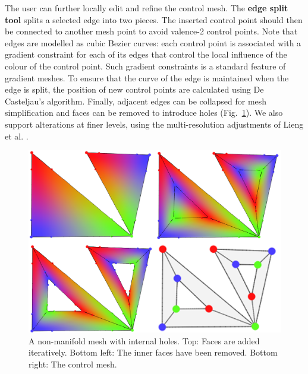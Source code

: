 \documentclass{egpubl}
\newcommand{\note}[3]{{\color{#2}\textbf{#1: #3}}}
\newcommand{\unsure}[1]{\note{USIKKER}{Green}{#1}}
\begin{document}
	The user can further locally edit and refine the control mesh. The \textbf{edge split tool} splits a selected edge into two pieces. The inserted control point should then be connected to another mesh point to avoid valence-2 control points. Note that edges are modelled as cubic Bezier curves: each control point is associated with a gradient constraint for each of its edges that control the local influence of the colour of the control point. Such gradient constraints is a standard feature of gradient meshes. To ensure that the curve of the edge is maintained when the edge is split, the position of new control points are calculated using De Casteljau's algorithm. Finally, adjacent edges can be collapsed for mesh simplification and faces can be removed to introduce holes (Fig.~\ref{fig:nonManifoldHoleMesh}). We also support alterations at finer levels, using the multi-resolution adjustments of Lieng et al. \cite{Lieng:2016}.
	
	
	\begin{figure}[t]
		\centering
		\includegraphics[scale=0.2]{HoleAndNonManifoldMesh.png}
		\caption{A non-manifold mesh with internal holes. Top: Faces are added iteratively. Bottom left: The inner faces have been removed.  Bottom right: The control mesh.}
		\label{fig:nonManifoldHoleMesh}
	\end{figure}
	
\end{document}
